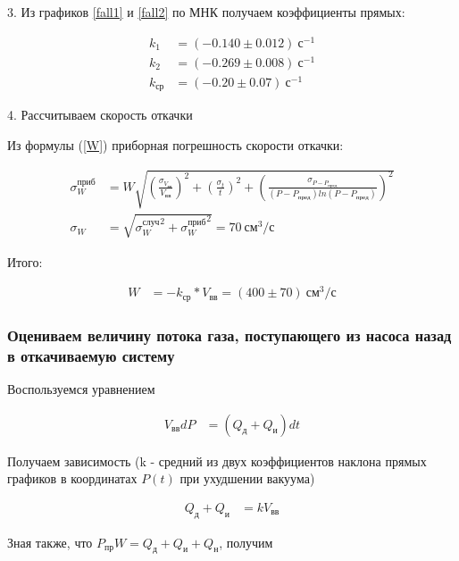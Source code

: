 \documentclass[a4paper, 12pt]{article}
\begin{document}
            3. Из графиков \ref{fall1} и \ref{fall2} по МНК получаем коэффициенты прямых:

            \begin{align*}
                k_1 &= (-0.140 \pm 0.012)~с^{-1}\\
                k_2 &= (-0.269 \pm 0.008)~с^{-1}\\
                k_{ср} &= (-0.20 \pm 0.07)~с^{-1}
            \end{align*}

            4. Рассчитываем скорость откачки

            Из формулы (\ref{W}) приборная погрешность скорости откачки:

            \begin{align*}
                \sigma_W^{приб} &= W \sqrt{\left( \frac{\sigma_{V_{вв}}}{V_{вв}} \right)^2 + \left( \frac{\sigma_{t}}{t} \right)^2 + \left( \frac{\sigma_{P - P_{пред}}}{(P - P_{пред}) ln(P - P_{пред})} \right)^2}\\
                \sigma_W &= \sqrt{{\sigma_W^{случ}}^2 + {\sigma_W^{приб}}^2} = 70~см^3/с
            \end{align*}

            Итого:

            \begin{align*}
                W &= -k_{ср} * V_{вв} = (400 \pm 70)~см^3/с
            \end{align*}

        \subsubsection{Оцениваем величину потока газа, поступающего из насоса назад в откачиваемую систему}

            Воспользуемся уравнением

            \begin{align*}
                V_{вв} dP &= (Q_д + Q_и)dt
            \end{align*}

            Получаем зависимость (k - средний из двух коэффициентов наклона прямых графиков в координатах $P(t)$ при ухудшении вакуума)

            \begin{align*}
                Q_д + Q_и &= k V_{вв}
            \end{align*}

            Зная также, что $P_{пр}W = Q_д + Q_и + Q_н$, получим
\end{document}
